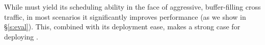 
\vspace{0.05in}
 While \name must yield its scheduling ability in the face of aggressive, buffer-filling cross traffic, in most scenarios it significantly improves performance (as we show in \S\ref{s:eval}).
This, combined with its deployment ease, makes a strong case for deploying \name. 

